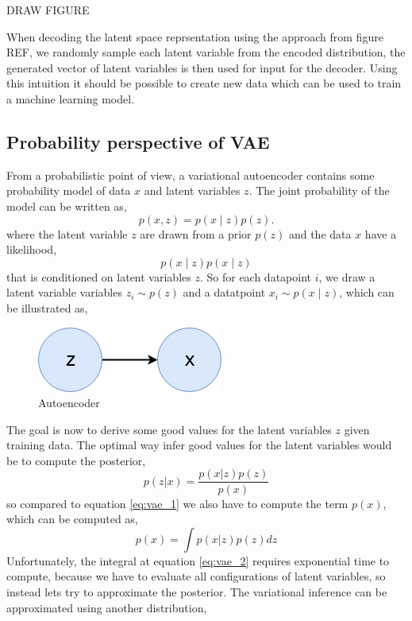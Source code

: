 \documentclass[11pt]{article}
\begin{document}
DRAW FIGURE

When decoding the latent space reprsentation using the approach from figure REF, we randomly sample each latent variable from the encoded distribution, the generated vector of latent variables is then used for input for the decoder. Using this intuition it should be possible to create new data which can be used to train a machine learning model.


\subsection{Probability perspective of VAE}

From a probabilistic point of view, a variational autoencoder contains some probability model of data $x$ and latent variables $z$. The joint probability of the model can be written as,
\begin{equation}\label{eq:vae_1}
    p(x, z) = p(x \mid z) p(z).
\end{equation}
where the latent variable $z$ are drawn from a prior $p(z)$ and the data $x$ have a likelihood,
\begin{equation}
    p(x \mid z)p(x∣z) 
\end{equation}
that is conditioned on latent variables $z$. So for each datapoint $i$, we draw a latent variable variables $z_i \sim p(z)$ and a datatpoint $x_i \sim p(x\mid z)$, which can be illustrated as,
\begin{figure}[!h]
    \centering
    \includegraphics[scale=0.45]{figurer/vae/vae_1.png}
    \caption{Autoencoder}
    \label{fig:vae}
\end{figure}
The goal is now to derive some good values for the latent variables $z$ given training data. The optimal way infer good values for the latent variables would be to compute the posterior,
\begin{equation}
    p(z | x) = \frac{p(x | z) p(z)}{p(x)}
\end{equation}
so compared to equation \ref{eq:vae_1} we also have to compute the term $p(x)$, which can be computed as,
\begin{equation}\label{eq:vae_2}
    p(x) = \int p(x | z) p(z) dz
\end{equation}
Unfortunately, the integral at equation \ref{eq:vae_2} requires exponential time to compute, because we have to evaluate all configurations of latent variables, so instead lets try to approximate the posterior. The variational inference can be approximated using another distribution,
\end{document}
